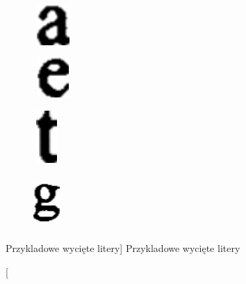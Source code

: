 \documentclass[a4paper,12pt]{article}
\begin{document}
            \begin{figure}[h!]
                \centering
                \begin{subfigure}[b]{2cm}
                    \includegraphics[width=1.5cm, height=1.5cm, frame]{image//exampleImage//letter_01.png}
                    \caption{}
                \end{subfigure}
                \begin{subfigure}[b]{2cm}
                    \includegraphics[width=1.5cm, height=1.5cm, frame]{image//exampleImage//letter_02.png}
                \caption{}
                \end{subfigure}
                \newline
                \begin{subfigure}[b]{2cm}
                    \includegraphics[width=1cm, height=2cm, frame]{image//exampleImage//letter_03.png}
                    \caption{}
                \end{subfigure}
                \begin{subfigure}[b]{2cm}
                    \includegraphics[width=1cm, height=2cm, frame]{image//exampleImage//letter_04.png}
                    \caption{}
                \end{subfigure}
                \caption
                [Przykladowe wycięte litery]
                {Przykladowe wycięte litery}
            \end{figure}
\end{document}
